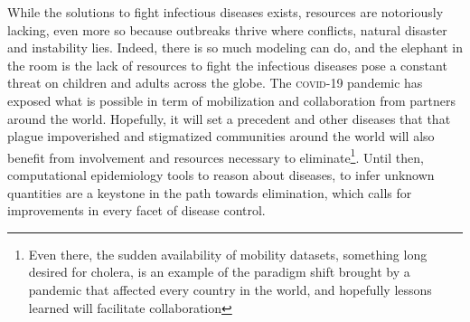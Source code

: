 While the solutions to fight infectious diseases exists, resources are notoriously lacking, even more so because outbreaks thrive where conflicts, natural disaster and instability lies. Indeed, there is so much modeling can do, and the elephant in the room is the lack of resources to fight the infectious diseases pose a constant threat on children and adults across the globe. The \textsc{covid}-19 pandemic has exposed what is possible in term of mobilization and collaboration from partners around the world. Hopefully, it will set a precedent and other diseases that that plague impoverished and stigmatized communities around the world will also benefit from involvement and resources necessary to eliminate\footnote[][-5\baselineskip]{Even there, the sudden availability of mobility datasets, something long desired for cholera, is an example of the paradigm shift brought by a pandemic that affected every country in the world, and hopefully lessons learned will facilitate collaboration}. Until then, computational epidemiology tools to reason about diseases, to infer unknown quantities are a keystone in the path towards elimination, which calls for improvements in every facet of disease control.







